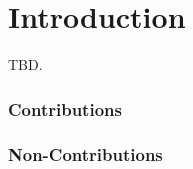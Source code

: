 \chapter{Introduction}
\label{chapter:Introduction}
TBD.

\subsection*{Contributions}
\subsection*{Non-Contributions}